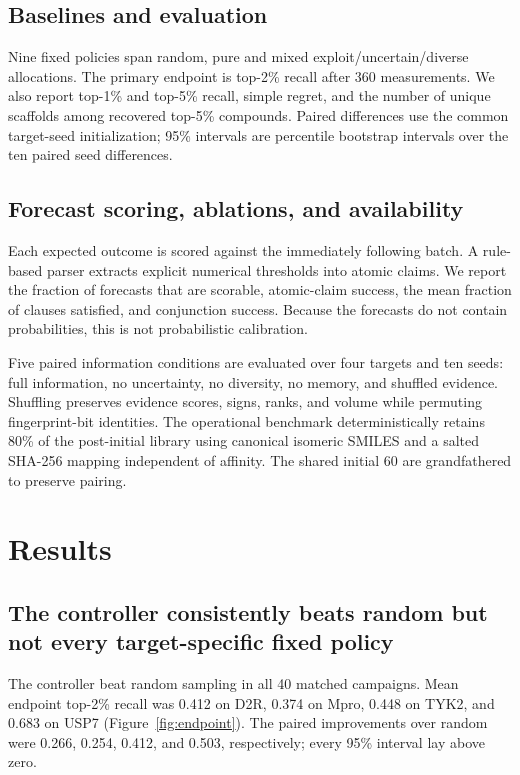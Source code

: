 \documentclass{article}
\begin{document}
\subsection{Baselines and evaluation}

Nine fixed policies span random, pure and mixed exploit/uncertain/diverse allocations. The primary endpoint is top-2\% recall after 360 measurements. We also report top-1\% and top-5\% recall, simple regret, and the number of unique scaffolds among recovered top-5\% compounds. Paired differences use the common target-seed initialization; 95\% intervals are percentile bootstrap intervals over the ten paired seed differences.

\subsection{Forecast scoring, ablations, and availability}

Each expected outcome is scored against the immediately following batch. A rule-based parser extracts explicit numerical thresholds into atomic claims. We report the fraction of forecasts that are scorable, atomic-claim success, the mean fraction of clauses satisfied, and conjunction success. Because the forecasts do not contain probabilities, this is not probabilistic calibration.

Five paired information conditions are evaluated over four targets and ten seeds: full information, no uncertainty, no diversity, no memory, and shuffled evidence. Shuffling preserves evidence scores, signs, ranks, and volume while permuting fingerprint-bit identities. The operational benchmark deterministically retains 80\% of the post-initial library using canonical isomeric SMILES and a salted SHA-256 mapping independent of affinity. The shared initial 60 are grandfathered to preserve pairing.

\section{Results}

\subsection{The controller consistently beats random but not every target-specific fixed policy}

The controller beat random sampling in all 40 matched campaigns. Mean endpoint top-2\% recall was 0.412 on D2R, 0.374 on Mpro, 0.448 on TYK2, and 0.683 on USP7 (Figure~\ref{fig:endpoint}). The paired improvements over random were 0.266, 0.254, 0.412, and 0.503, respectively; every 95\% interval lay above zero.
\end{document}
